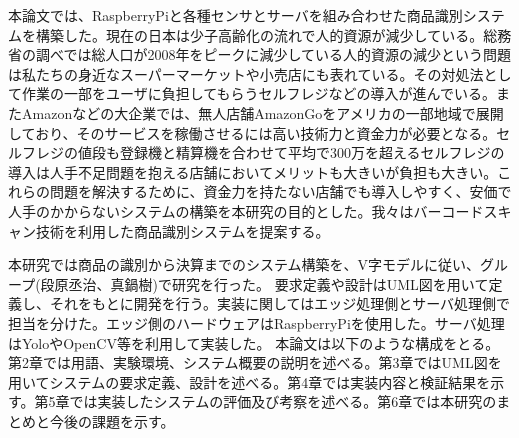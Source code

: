 本論文では、RaspberryPiと各種センサとサーバを組み合わせた商品識別システムを構築した。現在の日本は少子高齢化の流れで人的資源が減少している。総務省の調べでは総人口が2008年をピークに減少している\cite{population}人的資源の減少という問題は私たちの身近なスーパーマーケットや小売店にも表れている。その対処法として作業の一部をユーザに負担してもらうセルフレジなどの導入が進んでいる。またAmazonなどの大企業では、無人店舗AmazonGo\cite{amazongo}をアメリカの一部地域で展開しており、そのサービスを稼働させるには高い技術力と資金力が必要となる。セルフレジの値段も登録機と精算機を合わせて平均で300万を超える\cite{self_register}セルフレジの導入は人手不足問題を抱える店舗においてメリットも大きいが負担も大きい。これらの問題を解決するために、資金力を持たない店舗でも導入しやすく、安価で人手のかからないシステムの構築を本研究の目的とした。我々はバーコードスキャン技術を利用した商品識別システムを提案する。

本研究では商品の識別から決算までのシステム構築を、V字モデルに従い、グループ(段原丞治、真鍋樹)で研究を行った。
要求定義や設計はUML図を用いて定義し、それをもとに開発を行う。実装に関してはエッジ処理側とサーバ処理側で担当を分けた。エッジ側のハードウェアはRaspberryPiを使用した。サーバ処理はYoloやOpenCV等を利用して実装した。
本論文は以下のような構成をとる。第2章では用語、実験環境、システム概要の説明を述べる。第3章ではUML図を用いてシステムの要求定義、設計を述べる。第4章では実装内容と検証結果を示す。第5章では実装したシステムの評価及び考察を述べる。第6章では本研究のまとめと今後の課題を示す。